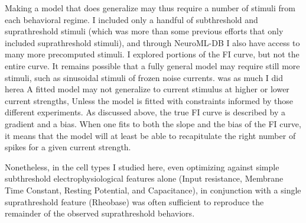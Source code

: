 Making a model that does generalize may thus require a number of stimuli from each behavioral regime.
I included only a handful of subthreshold and suprathreshold stimuli (which was more than some previous efforts that only included suprathreshold stimuli), and through NeuroML-DB I also have access to many more precomputed stimuli.
I explored portions of the FI curve, but not the entire curve.
It remains possible that a fully general model may require still more stimuli, such as sinusoidal stimuli of frozen noise currents.
was as much I did herea A fitted model may not generalize to current stimulus at higher or lower current strengths, Unless the model is fitted with constraints informed by those different experiments. As discussed above, the true FI curve is described by a gradient and a bias. When one fits to both the slope and the bias of the FI curve, it means that the model will at least be able to recapitulate the right number of spikes for  a given current strength. %

%


Nonetheless, in the cell types I studied here, even optimizing against simple subthreshold electrophysiological features alone (Input resistance, Membrane Time Constant, Resting Potential, and Capacitance), in conjunction with a single suprathreshold feature (Rheobase) was often sufficient to reproduce the remainder of the observed suprathreshold behaviors.





